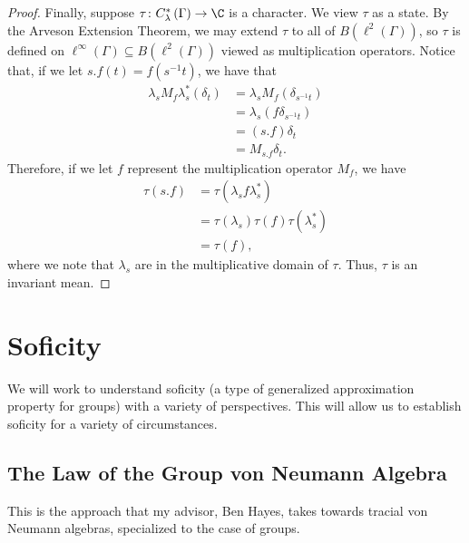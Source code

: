 \documentclass[10pt]{mypackage}
\begin{document}
\begin{proof}
  Finally, suppose $\tau\colon C^{\ast}_{\lambda}\left( \Gamma \right)\to \C$ is a character. We view $\tau$ as a state. By the Arveson Extension Theorem, we may extend $\tau$ to all of $B\left( \ell^2\left( \Gamma \right) \right)$, so $\tau$ is defined on $\ell^{\infty}\left( \Gamma \right)\subseteq B\left( \ell^2\left( \Gamma \right) \right)$ viewed as multiplication operators. Notice that, if we let $s.f(t) = f\left( s^{-1}t \right)$, we have that
  \begin{align*}
    \lambda_sM_f\lambda_s^{\ast}\left( \delta_t \right) &= \lambda_sM_f\left( \delta_{s^{-1}t} \right)\\
                                                        &= \lambda_s\left( f\delta_{s^{-1}t} \right)\\
                                                        &= \left( s.f \right)\delta_{t}\\
                                                        &= M_{s.f}\delta_{t}.
  \end{align*}
  Therefore, if we let $f$ represent the multiplication operator $M_f$, we have
  \begin{align*}
    \tau\left( s.f \right) &= \tau\left( \lambda_sf \lambda_s^{\ast} \right)\\
                           &= \tau\left( \lambda_s \right)\tau\left( f \right)\tau\left( \lambda_s^{\ast} \right)\\
                           &=\tau\left( f \right),
  \end{align*}
  where we note that $\lambda_s$ are in the multiplicative domain of $\tau$. Thus, $\tau$ is an invariant mean.
\end{proof}
\section{Soficity}%
We will work to understand soficity (a type of generalized approximation property for groups) with a variety of perspectives. This will allow us to establish soficity for a variety of circumstances.
\subsection{The Law of the Group von Neumann Algebra}%
This is the approach that my advisor, Ben Hayes, takes towards tracial von Neumann algebras, specialized to the case of groups.
\end{document}
